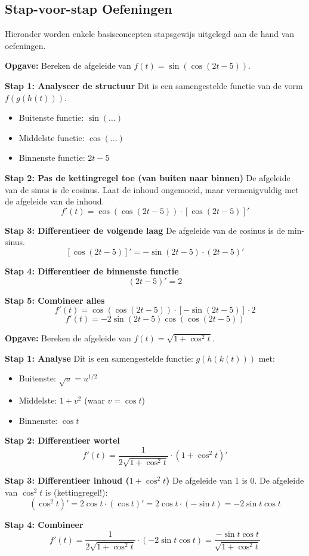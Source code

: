 \subsection{Stap-voor-stap Oefeningen}

Hieronder worden enkele basisconcepten stapsgewijs uitgelegd aan de hand van oefeningen.

\begin{oefenblok}
\textbf{Opgave:} Bereken de afgeleide van $f(t) = \sin(\cos(2t - 5))$.

\textbf{Stap 1: Analyseer de structuur}
Dit is een samengestelde functie van de vorm $f(g(h(t)))$.
\begin{itemize}
    \item Buitenste functie: $\sin(\dots)$
    \item Middelste functie: $\cos(\dots)$
    \item Binnenste functie: $2t - 5$
\end{itemize}

\textbf{Stap 2: Pas de kettingregel toe (van buiten naar binnen)}
De afgeleide van de sinus is de cosinus. Laat de inhoud ongemoeid, maar vermenigvuldig met de afgeleide van de inhoud.
\[ f'(t) = \cos(\cos(2t - 5)) \cdot [\cos(2t - 5)]' \]

\textbf{Stap 3: Differentieer de volgende laag}
De afgeleide van de cosinus is de min-sinus.
\[ [\cos(2t - 5)]' = -\sin(2t - 5) \cdot (2t - 5)' \]

\textbf{Stap 4: Differentieer de binnenste functie}
\[ (2t - 5)' = 2 \]

\textbf{Stap 5: Combineer alles}
\[ f'(t) = \cos(\cos(2t - 5)) \cdot [-\sin(2t - 5)] \cdot 2 \]
\[ \boxed{f'(t) = -2 \sin(2t - 5) \cos(\cos(2t - 5))} \]
\end{oefenblok}

\begin{oefenblok}
\textbf{Opgave:} Bereken de afgeleide van $f(t) = \sqrt{1+\cos^2 t}$.

\textbf{Stap 1: Analyse}
Dit is een samengestelde functie: $g(h(k(t)))$ met:
\begin{itemize}
    \item Buitenste: $\sqrt{u} = u^{1/2}$
    \item Middelste: $1+v^2$ (waar $v=\cos t$)
    \item Binnenste: $\cos t$
\end{itemize}

\textbf{Stap 2: Differentieer wortel}
\[ f'(t) = \frac{1}{2\sqrt{1+\cos^2 t}} \cdot (1+\cos^2 t)' \]

\textbf{Stap 3: Differentieer inhoud ($1+\cos^2 t$)}
De afgeleide van 1 is 0. De afgeleide van $\cos^2 t$ is (kettingregel!):
\[ (\cos^2 t)' = 2\cos t \cdot (\cos t)' = 2\cos t \cdot (-\sin t) = -2\sin t \cos t \]

\textbf{Stap 4: Combineer}
\[ \boxed{f'(t) = \frac{1}{2\sqrt{1+\cos^2 t}} \cdot (-2\sin t \cos t) = \frac{-\sin t \cos t}{\sqrt{1+\cos^2 t}}} \]
\end{oefenblok}

